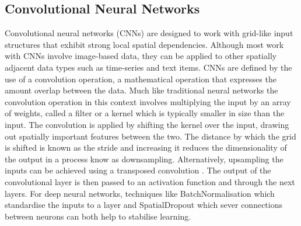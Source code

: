 \documentclass[12pt]{iopart}
\begin{document}
\subsection{Convolutional Neural Networks}
%
Convolutional neural networks (CNNs) are designed to work with grid-like input structures that exhibit
strong local spatial dependencies. Although most work with \acp{CNN}
involve image-based data, they can be applied to other spatially adjacent data
types such as time-series and text items. \acp{CNN} are defined by the use of a
convolution operation, a mathematical operation that expresses the amount
overlap between the data. Much like traditional neural networks the convolution operation in this context involves multiplying the input by an array of weights, called a filter or a kernel which is typically smaller in size than the input. The convolution is applied by shifting the kernel over the input, drawing out spatially important features between the
two. The distance by which the grid is shifted is known as
the stride and increasing it reduces the dimensionality of the output in a process know as downsampling. Alternatively, upsampling the inputs can be achieved using a transposed convolution \cite{dumoulin2016guide}. The output of the convolutional layer is then passed to an activation function and through the next layers. For deep neural networks, techniques like BatchNormalisation \cite{ioffe2015batch} which standardise the inputs to a layer and SpatialDropout \cite{tompson2014efficient} which sever connections between neurons can both help to stabilise learning.  


\end{document}
